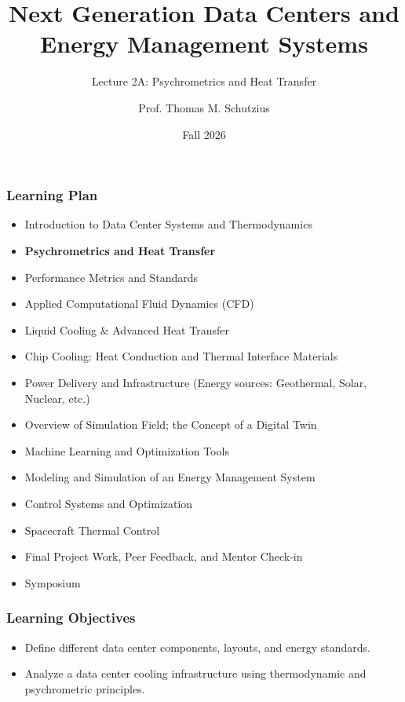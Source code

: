 \documentclass[aspectratio=169,10pt,xcolor={table,dvipsnames},t]{beamer}
\title[lecture 02]{Next Generation Data Centers and Energy Management Systems}
\subtitle{Lecture 2A: Psychrometrics and Heat Transfer}
\author{Prof. Thomas M. Schutzius}
\institute{Department of Mechanical Engineering}
\date{Fall 2026}
\begin{document}
\begin{frame}
  \titlepage
\end{frame}


{
\smallframetitle
	\begin{frame}
		\frametitle{Learning Plan}
		\begin{itemize}
			\item Introduction to Data Center Systems and Thermodynamics 
			\item \textbf{Psychrometrics and Heat Transfer}
			\item Performance Metrics and Standards 
			\item Applied Computational Fluid Dynamics (CFD)
			\item Liquid Cooling \& Advanced Heat Transfer 
			\item Chip Cooling: Heat Conduction and Thermal Interface Materials 
			\item Power Delivery and Infrastructure (Energy sources: Geothermal, Solar, Nuclear, etc.)
			\item Overview of Simulation Field; the Concept of a Digital Twin 
			\item Machine Learning and Optimization Tools 
			\item Modeling and Simulation of an Energy Management System 
			\item Control Systems and Optimization 
			\item Spacecraft Thermal Control
			\item Final Project Work, Peer Feedback, and Mentor Check-in 
			\item Symposium 
		\end{itemize}		
	\end{frame}
}

{
\smallframetitle
	\begin{frame}
		\frametitle{Learning Objectives}
		\begin{itemize}
			\item Define different data center components, layouts, and energy standards.
			\item Analyze a data center cooling infrastructure using thermodynamic and psychrometric principles.
		\end{itemize}		
	\end{frame}
}
\end{document}
